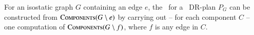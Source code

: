 \begin{figure}
{    %
    }
    \label{fig:seq_proof}
\end{figure}



\begin{lemma}
\label{lem:branch-from-branch-leaves}
    For an isostatic graph $G$ containing an edge $e$, the \branchGePG\ for a \pseudosequential\ DR-plan $P_G$ can be constructed from $\textsc{Components}(G\setminus e)$ by carrying out -- for each component $C$ -- one computation of $\textsc{Components}(G\setminus f)$, where $f$ is any edge in $C$.
\end{lemma}

